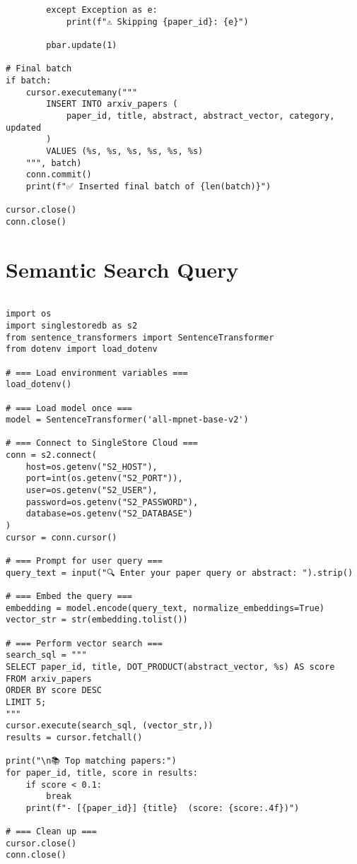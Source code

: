 \documentclass[11pt]{article}
\begin{document}
\begin{verbatim}
        except Exception as e:
            print(f"⚠️ Skipping {paper_id}: {e}")

        pbar.update(1)

# Final batch
if batch:
    cursor.executemany("""
        INSERT INTO arxiv_papers (
            paper_id, title, abstract, abstract_vector, category, updated
        )
        VALUES (%s, %s, %s, %s, %s, %s)
    """, batch)
    conn.commit()
    print(f"✅ Inserted final batch of {len(batch)}")

cursor.close()
conn.close()

\end{verbatim}
\section*{Semantic Search Query}
\label{sec:org03330f0}

\begin{verbatim}

import os
import singlestoredb as s2
from sentence_transformers import SentenceTransformer
from dotenv import load_dotenv

# === Load environment variables ===
load_dotenv()

# === Load model once ===
model = SentenceTransformer('all-mpnet-base-v2')

# === Connect to SingleStore Cloud ===
conn = s2.connect(
    host=os.getenv("S2_HOST"),
    port=int(os.getenv("S2_PORT")),
    user=os.getenv("S2_USER"),
    password=os.getenv("S2_PASSWORD"),
    database=os.getenv("S2_DATABASE")
)
cursor = conn.cursor()

# === Prompt for user query ===
query_text = input("🔍 Enter your paper query or abstract: ").strip()

# === Embed the query ===
embedding = model.encode(query_text, normalize_embeddings=True)
vector_str = str(embedding.tolist())

# === Perform vector search ===
search_sql = """
SELECT paper_id, title, DOT_PRODUCT(abstract_vector, %s) AS score
FROM arxiv_papers
ORDER BY score DESC
LIMIT 5;
"""
cursor.execute(search_sql, (vector_str,))
results = cursor.fetchall()

print("\n📚 Top matching papers:")
for paper_id, title, score in results:
    if score < 0.1:
        break
    print(f"- [{paper_id}] {title}  (score: {score:.4f})")

# === Clean up ===
cursor.close()
conn.close()

\end{verbatim}
\end{document}
